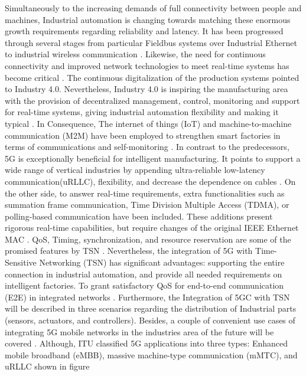 Simultaneously to the increasing demands of full connectivity between people and machines, Industrial automation is changing towards matching these enormous growth requirements regarding reliability and latency. It has been progressed through several stages from particular Fieldbus systems over Industrial Ethernet to industrial wireless communication \cite{5535166}. Likewise, the need for continuous connectivity and improved network technologies to meet real-time systems has become critical \cite{Ericsson2019}. The continuous digitalization of the production systems pointed to Industry 4.0. Nevertheless, Industry 4.0 is inspiring the manufacturing area with the provision of decentralized management, control, monitoring and support for real-time systems, giving industrial automation flexibility and making it typical \cite{gardiner2018avnu}\cite{3gpp2018study}. In Consequence, The internet of things (IoT) and machine-to-machine communication (M2M) have been employed to strengthen smart factories in terms of communications and self-monitoring \cite{kagermann2013recommendations}. 
In contrast to the predecessors, 5G is exceptionally beneficial for intelligent manufacturing. It points to support a wide range of vertical industries by appending ultra-reliable low-latency communication(uRLLC), flexibility, and decrease the dependence on cables \cite{Ericsson2019}. 
On the other side, to answer real-time requirements, extra functionalities such as summation frame communication, Time Division Multiple Access (TDMA), or polling-based communication have been included. These additions present rigorous real-time capabilities, but require changes of the original IEEE Ethernet MAC \cite{wisniewski2012fast}. QoS, Timing, synchronization, and resource reservation are some of the promised features by TSN \cite{bello2014novel}.  Nevertheless, the integration of 5G with Time-Sensitive Networking (TSN) has significant advantages: supporting the entire connection in industrial automation, and provide all needed requirements on intelligent factories. To grant satisfactory QoS for end-to-end communication (E2E) in integrated networks \cite{7883994}.
Furthermore, the Integration of 5GC with TSN will be described in three scenarios regarding the distribution of Industrial parts (sensors, actuators, and controllers). Besides, a couple of convenient use cases of integrating 5G mobile networks in the industries area of the future will be covered \cite{3gpp2018study}. Although, ITU classified 5G applications into three types: Enhanced mobile broadband (eMBB), massive machine-type communication (mMTC), and uRLLC shown in figure
